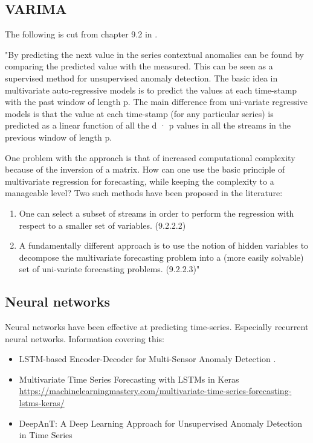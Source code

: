 \subsection{VARIMA} The following is cut from chapter 9.2 in \cite{Aggarwal2013a}. \newline

"By predicting the next value in the series contextual anomalies can be found by comparing the predicted value with the measured. This can be seen as a supervised method for unsupervised anomaly detection. The basic idea in multivariate auto-regressive models is to predict the values at each time-stamp with the past window of length p. The main difference from uni-variate regressive models is that the value at each time-stamp (for any particular series) is predicted as a linear function of all the d · p values in all the streams in the previous window of length p.

One problem with the approach is that of increased computational complexity because of the inversion of a matrix. How can one use the basic principle of multivariate regression for forecasting, while keeping the complexity to a manageable level? Two such methods have been proposed in the literature:

\begin{enumerate}
    \item One can select a subset of streams in order to perform the regression with respect to a smaller set of variables. (9.2.2.2)
    \item A fundamentally different approach is to use the notion of hidden variables to decompose the multivariate forecasting problem into a (more easily solvable) set of uni-variate forecasting problems. (9.2.2.3)"
\end{enumerate}


\subsection{Neural networks} Neural networks have been effective at predicting time-series. Especially recurrent neural networks. Information covering this:
\begin{itemize}
    \item LSTM-based Encoder-Decoder for Multi-Sensor Anomaly Detection \cite{Malhotra2016a}.
    \item Multivariate Time Series Forecasting with LSTMs in Keras \newline \url{https://machinelearningmastery.com/multivariate-time-series-forecasting-lstms-keras/}
    \item DeepAnT: A Deep Learning Approach for Unsupervised Anomaly Detection in Time Series \cite{Munir2019DeepAnT:Series}
\end{itemize}

